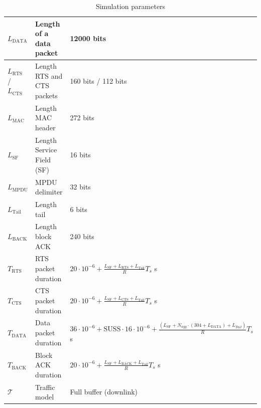 \documentclass[preprint,12pt]{elsarticle}
\begin{document}
\begin{appendices}
\begin{table}[h!]
{\begin{tabular}{|l|l|l|}
		$L_{\text{DATA}}$ & Length of a data packet & 12000 bits \\ \hline
		$L_{\text{RTS}}$ / $L_{\text{CTS}}$ & Length RTS and CTS packets & 160 bits / 112 bits \\ \hline
		$L_{\text{MAC}}$ & Length MAC header & 272 bits \\ \hline
		$L_{\text{SF}}$ & Length Service Field (SF) & 16 bits \\ \hline
		$L_{\text{MPDU}}$ & MPDU delimiter & 32 bits \\ \hline
		$L_{\text{Tail}}$ & Length tail & 6 bits \\ \hline
		$L_{\text{BACK}}$ & Length block ACK & 240 bits \\ \hline	
		$T_{\text{RTS}}$ & RTS packet duration & $20\cdot 10^{-6} + \frac{L_{\text{SF}}+L_{\text{RTS}}+L_{\text{Tail}}}{R}T_s$ s\\ \hline	
		$T_{\text{CTS}}$ & CTS packet duration & $20\cdot 10^{-6} + \frac{L_{\text{SF}}+L_{\text{CTS}}+L_{\text{Tail}}}{R}T_s$ s \\ \hline	
		$T_{\text{DATA}}$ & Data packet duration & $36\cdot 10^{-6} + \text{SUSS} \cdot 16 \cdot 10^{-6} + \frac{(L_{\text{SF}}+N_{agg}\cdot(304+L_{\text{DATA}})+L_{Tail})}{R}T_s$ s \\ \hline	
		$T_{\text{BACK}}$ & Block ACK duration & $20 \cdot 10^{-6} + \frac{L_{\text{SF}}+L_{\text{BACK}}+L_{\text{Tail}}}{R}T_s $ s\\ \hline	
		$\mathcal{T}$ & Traffic model & Full buffer (downlink) \\ \hline	
	\end{tabular}}
	\caption{Simulation parameters}
	\label{tbl:simulation_parameters}
\end{table}	
\end{appendices}

\newpage
%
\section*{\refname}

\end{document}
